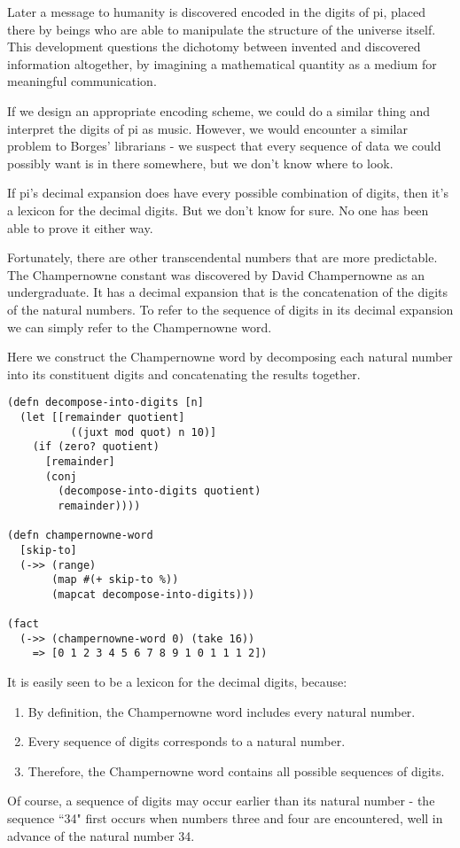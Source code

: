 \documentclass[numbers]{sigplanconf}
\begin{document}
Later a message to humanity is discovered encoded in the digits of pi, placed there by beings who are able to manipulate the
structure of the universe itself. This development questions the dichotomy between invented and discovered information altogether,
by imagining a mathematical quantity as a medium for meaningful communication.

If we design an appropriate encoding scheme, we could do a similar thing and interpret the digits of pi as music. However,
we would encounter a similar problem to Borges' librarians - we suspect that every sequence of data we could possibly want
is in there somewhere, but we don't know where to look.

If pi's decimal expansion does have every possible combination of digits, then it's a lexicon for the decimal digits.
But we don't know for sure. No one has been able to prove it either way.

Fortunately, there are other transcendental numbers that are more predictable. The Champernowne constant was discovered
by David Champernowne as an undergraduate\cite{The construction of decimals normal in the scale of ten}. It has a
decimal expansion that is the concatenation of the digits of the natural numbers. To refer to the sequence of digits
in its decimal expansion we can simply refer to the Champernowne word.

Here we construct the Champernowne word by decomposing each natural number into its constituent digits and concatenating
the results together.

\begin{verbatim}
(defn decompose-into-digits [n]
  (let [[remainder quotient]
          ((juxt mod quot) n 10)]
    (if (zero? quotient)
      [remainder]
      (conj
        (decompose-into-digits quotient)
        remainder))))

(defn champernowne-word
  [skip-to]
  (->> (range)
       (map #(+ skip-to %))
       (mapcat decompose-into-digits)))

(fact
  (->> (champernowne-word 0) (take 16))
    => [0 1 2 3 4 5 6 7 8 9 1 0 1 1 1 2])
\end{verbatim}

It is easily seen to be a lexicon for the decimal digits, because:
\begin{enumerate}
    \item By definition, the Champernowne word includes every natural number.
    \item Every sequence of digits corresponds to a natural number.
    \item Therefore, the Champernowne word contains all possible sequences of digits.
\end{enumerate}
Of course, a sequence of digits may occur earlier than its natural number - the sequence ``34" first occurs when numbers three and
four are encountered, well in advance of the natural number 34.
\end{document}
